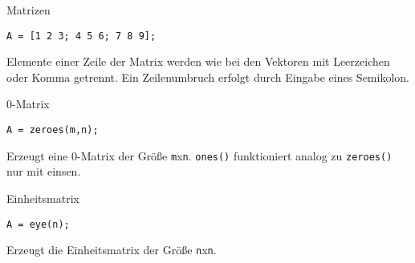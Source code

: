             \begin{CodeErklaerungBox}{Matrizen}
                \begin{lstlisting}
A = [1 2 3; 4 5 6; 7 8 9];
                \end{lstlisting}
                \tcblower
                Elemente einer Zeile der Matrix werden wie bei den Vektoren mit Leerzeichen oder Komma getrennt. Ein Zeilenumbruch erfolgt durch Eingabe eines Semikolon.
            \end{CodeErklaerungBox}
            \begin{CodeErklaerungBox}{0-Matrix}
                \begin{lstlisting}
A = zeroes(m,n);
                \end{lstlisting}
                \tcblower
                Erzeugt eine 0-Matrix der Größe \texttt{m}x\texttt{n}. \texttt{ones()} funktioniert analog zu \texttt{zeroes()} nur mit einsen.
            \end{CodeErklaerungBox}
            \begin{CodeErklaerungBox}{Einheitsmatrix}
                \begin{lstlisting}
A = eye(n);
                \end{lstlisting}
                \tcblower
                Erzeugt die Einheitsmatrix der Größe \texttt{n}x\texttt{n}.
            \end{CodeErklaerungBox}
